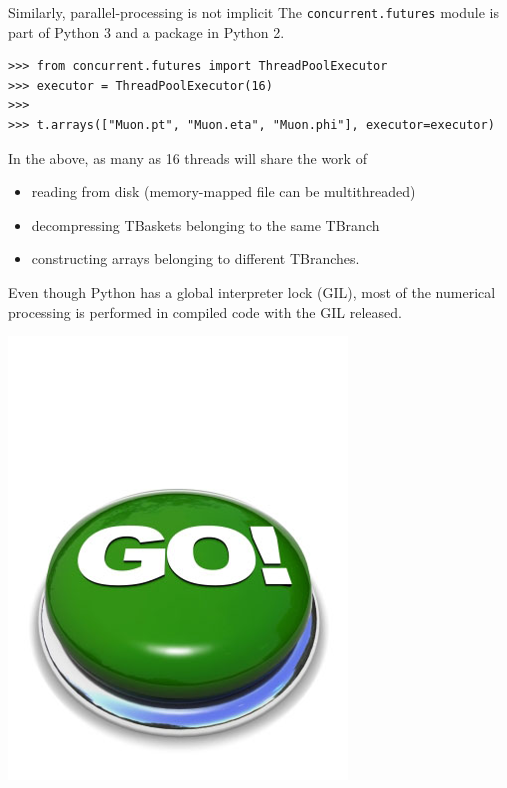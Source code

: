 \documentclass[aspectratio=169]{beamer}
\begin{document}
\begin{frame}[fragile]{Similarly, parallel-processing is not implicit}
\vspace{1 cm}
The {\tt\small concurrent.futures} module is part of Python 3 and a package in Python 2.

\small
\begin{verbatim}
>>> from concurrent.futures import ThreadPoolExecutor
>>> executor = ThreadPoolExecutor(16)
>>> 
>>> t.arrays(["Muon.pt", "Muon.eta", "Muon.phi"], executor=executor)
\end{verbatim}

\normalsize
\vspace{0.25 cm}
In the above, as many as 16 threads will share the work of
\begin{itemize}
\item reading from disk (memory-mapped file can be multithreaded)
\item decompressing TBaskets belonging to the same TBranch
\item constructing arrays belonging to different TBranches.
\end{itemize}

\vspace{0.25 cm}
Even though Python has a global interpreter lock (GIL), most of the numerical processing is performed in compiled code with the GIL released.

\vspace{-3 cm}
\hfill \includegraphics[width=1.5 cm]{safe.png}\hspace{-0.9 cm}
\vspace{3 cm}
\end{frame}
\end{document}
